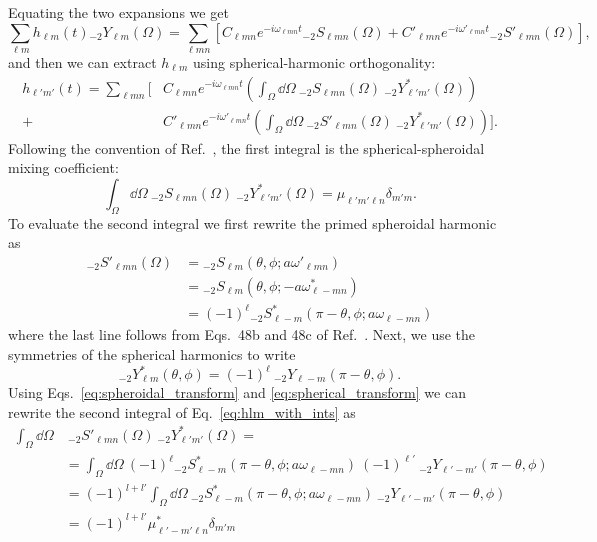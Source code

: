 Equating the two expansions we get
\begin{equation}
    \sum_{\ell m} h_{\ell m}(t) {}_{-2}Y_{\ell m}(\Omega) = \sum_{\ell m n} \left[ C_{\ell m n} e^{-i \omega_{\ell m n} t} {}_{-2}S_{\ell m n}(\Omega) + C'_{\ell m n} e^{-i \omega'_{\ell m n} t} {}_{-2}S'_{\ell m n}(\Omega) \right],
\end{equation}
and then we can extract $h_{\ell m}$ using spherical-harmonic orthogonality:
\begin{align}\label{eq:hlm_with_ints}
    h_{\ell' m'}(t) = \sum_{\ell m n} \bigg[ &C_{\ell m n} e^{-i \omega_{\ell m n} t} \left(\int_\Omega \dd{\Omega} ~ {}_{-2}S_{\ell m n}(\Omega) ~ {}_{-2}Y^*_{\ell' m'}(\Omega)\right) \nonumber \\
    + &C'_{\ell m n} e^{-i \omega'_{\ell m n} t} \left(\int_\Omega \dd{\Omega} ~ {}_{-2}S'_{\ell m n}(\Omega) ~ {}_{-2}Y^*_{\ell' m'}(\Omega)\right) \bigg].
\end{align}
Following the convention of Ref.~\cite{Stein:2019mop}, the first integral is the spherical-spheroidal mixing coefficient:
\begin{equation}
    \int_\Omega \dd{\Omega} ~ {}_{-2}S_{\ell m n}(\Omega) ~ {}_{-2}Y^*_{\ell' m'}(\Omega) = \mu_{\ell' m' \ell n} \delta_{m' m}.
\end{equation}
To evaluate the second integral we first rewrite the primed spheroidal harmonic as 
\begin{align}\label{eq:spheroidal_transform}
    {}_{-2}S'_{\ell m n}(\Omega) &= {}_{-2}S_{\ell m}(\theta, \phi; a\omega'_{\ell m n}) \nonumber \\
    &= {}_{-2}S_{\ell m}(\theta, \phi; -a\omega^*_{\ell -m n}) \nonumber \\
    &= (-1)^\ell {}_{-2}S^*_{\ell -m}(\pi - \theta, \phi; a\omega_{\ell -m n})
\end{align}
where the last line follows from Eqs.~48b and 48c of Ref.~\cite{Cook:2014cta}.
Next, we use the symmetries of the spherical harmonics to write
\begin{equation}\label{eq:spherical_transform}
    {}_{-2}Y^*_{\ell m}(\theta, \phi) = (-1)^{\ell} ~ {}_{-2}Y_{\ell -m}(\pi - \theta, \phi).
\end{equation}
Using Eqs.~\ref{eq:spheroidal_transform} and \ref{eq:spherical_transform} we can rewrite the second integral of Eq.~\ref{eq:hlm_with_ints} as
\begin{align}
    \int_\Omega \dd{\Omega}& ~ {}_{-2}S'_{\ell m n}(\Omega) ~ {}_{-2}Y^*_{\ell' m'}(\Omega) = \nonumber \\ 
    &= \int_\Omega \dd{\Omega} ~ (-1)^\ell {}_{-2}S^*_{\ell -m}(\pi - \theta, \phi; a\omega_{\ell -m n}) ~ (-1)^{\ell'} ~ {}_{-2}Y_{\ell' -m'}(\pi - \theta, \phi) \nonumber \\
    &= (-1)^{l+l'} \int_\Omega \dd{\Omega} ~ {}_{-2}S^*_{\ell -m}(\pi - \theta, \phi; a\omega_{\ell -m n}) ~ {}_{-2}Y_{\ell' -m'}(\pi - \theta, \phi) \nonumber \\
    &= (-1)^{l+l'} \mu^*_{\ell' -m' \ell n} \delta_{m' m}
\end{align}
